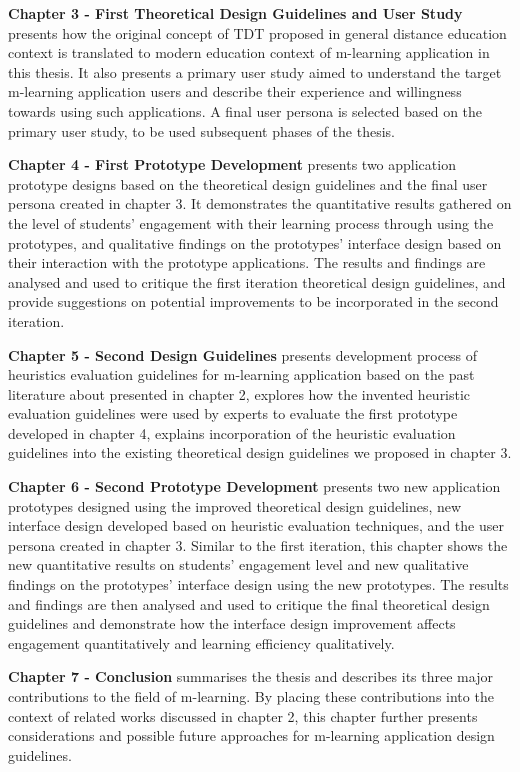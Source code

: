 \textbf{Chapter 3 - First Theoretical Design Guidelines and User Study} presents how the original concept of TDT proposed in general distance education context is translated to modern education context of m-learning application in this thesis. It also presents a primary user study aimed to understand the target m-learning application users and describe their experience and willingness towards using such applications. A final user persona is selected based on the primary user study, to be used subsequent phases of the thesis. 

\textbf{Chapter 4 - First Prototype Development} presents two application prototype designs based on the theoretical design guidelines and the final user persona created in chapter 3. It demonstrates the quantitative results gathered on the level of students' engagement with their learning process through using the prototypes, and qualitative findings on the prototypes' interface design based on their interaction with the prototype applications. The results and findings are analysed and used to critique the first iteration theoretical design guidelines, and provide suggestions on potential improvements to be incorporated in the second iteration. 

\textbf{Chapter 5 - Second Design Guidelines} presents development process of heuristics evaluation guidelines for m-learning application based on the past literature about presented in chapter 2, explores how the invented heuristic evaluation guidelines were used by experts to evaluate the first prototype developed in chapter 4, explains incorporation of the heuristic evaluation guidelines into the existing theoretical design guidelines we proposed in chapter 3. 

\textbf{Chapter 6 - Second Prototype Development} presents two new application prototypes designed using the improved theoretical design guidelines, new interface design developed based on heuristic evaluation techniques, and the user persona created in chapter 3. Similar to the first iteration, this chapter shows the new quantitative results on students' engagement level and new qualitative findings on the prototypes' interface design using the new prototypes. The results and findings are then analysed and used to critique the final theoretical design guidelines and demonstrate how the interface design improvement affects engagement quantitatively and learning efficiency qualitatively. 

\textbf{Chapter 7 - Conclusion} summarises the thesis and describes its three major contributions to the field of m-learning. By placing these contributions into the context of related works discussed in chapter 2, this chapter further presents considerations and possible future approaches for m-learning application design guidelines. 

